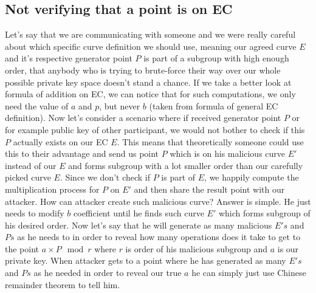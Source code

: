 \documentclass[bp,en]{FEIstyle}
\begin{document}
\subsection*{Not verifying that a point is on EC}
Let's say that we are communicating with someone and we were really careful about which specific curve definition we should use, meaning our agreed curve $E$ and it's respective generator point $P$ is part of a subgroup with high enough order, that anybody who is trying to brute-force their way over our whole possible private key space doesn't stand a chance. If we take a better look at formula of addition on EC, we can notice that for such computations, we only need the value of $a$ and $p$, but never $b$ (taken from formula of general EC definition). Now let's consider a scenario where if received generator point $P$ or for example public key of other participant, we would not bother to check if this $P$ actually exists on our EC $E$. This means that theoretically someone could use this to their advantage and send us point $P$ which is on his malicious curve $E'$ instead of our $E$ and forms subgroup with a lot smaller order than our carefully picked curve $E$. Since we don't check if $P$ is part of $E$, we happily compute the multiplication process for $P$ on $E'$ and then share the result point with our attacker. How can attacker create such malicious curve? Answer is simple. He just needs to modify $b$ coefficient until he finds such curve $E'$ which forms subgroup of his desired order. Now let's say that he will generate as many malicious $E's$ and $Ps$ as he needs to in order to reveal how many operations does it take to get to the point $a\times P \mod r$ where $r$ is order of his malicious subgroup and $a$ is our private key. When attacker gets to a point where he has generated as many $E's$ and $Ps$ as he needed in order to reveal our true $a$ he can simply just use Chinese remainder theorem to tell him.   
\end{document}
